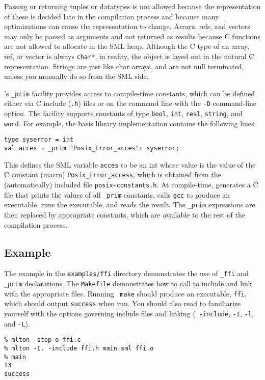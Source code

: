 Passing or returning tuples or datatypes is not allowed because the
representation of these is decided late in the compilation
process and because many optimizations can cause the representation to
change.  Arrays, refs, and vectors may only be passed as arguments and
not returned as results because C functions are not allowed to
allocate in the SML heap.  Although the C type of an array, ref, or
vector is always {\tt char*}, in reality, the object is layed out in
the natural C representation.
Strings are just
like char arrays, and are not null terminated, unless you manually do
so from the SML side.


{\mlton}'s \verb+_prim+ facility provides access to compile-time constants,
which can be defined either via C include ({\tt .h}) files or on the command
line with the {\tt -D} command-line option.
The facility supports constants of type {\tt bool}, {\tt int}, {\tt real},
{\tt string}, and {\tt word}.
For example, the basis library
implementation contains the following lines.
\begin{verbatim}
type syserror = int
val acces = _prim "Posix_Error_acces": syserror;
\end{verbatim}
This defines the SML variable {\tt acces} to be an int whose value is the value
of the C constant (macro) \verb+Posix_Error_access+, which is obtained from the
(automatically) included file {\tt posix-constants.h}.  At compile-time, {\mlton}
generates a C file that prints the values of all \verb+_prim+ constants, calls
{\tt gcc} to produce an executable, runs the executable, and reads the result.
The \verb+_prim+ expressions are then replaced by appropriate constants, which
are available to the rest of the compilation process.

\subsection{Example}

The example in the {\tt examples/ffi} directory demonstrates the use of
\verb+_ffi+ and \verb+_prim+ declarations.  The {\tt Makefile} demonstrates how
to call {\mlton} to include and link with the appropriate files.  Running {\tt
make} should produce an executable, {\tt ffi}, which should output {\tt success}
when run.  You should also read  to familiarize
yourself with the {\mlton} options governing include files and linking ({\tt
-include}, {\tt -I}, {\tt -l}, and {\tt -L}).

\begin{verbatim}
% mlton -stop o ffi.c
% mlton -I. -include ffi.h main.sml ffi.o
% main
13
success
\end{verbatim}
